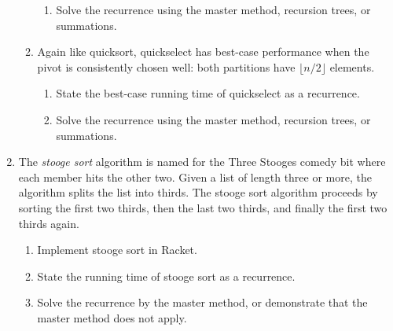 \documentclass{article}
\begin{document}
\begin{enumerate}
\begin{enumerate}
\begin{enumerate}
    \item Solve the recurrence using the master method, recursion trees, or
      summations.
    \end{enumerate}
  \item
    Again like quicksort, quickselect has best-case performance when the pivot
    is consistently chosen well: both partitions have \(\lfloor{n/2}\rfloor\)
    elements.
    \begin{enumerate}
    \item State the best-case running time of quickselect as a recurrence.
    \item Solve the recurrence using the master method, recursion trees, or
      summations.
    \end{enumerate}
  \end{enumerate}

  \pagebreak[1]
\item
  The \emph{stooge sort} algorithm is named for the Three Stooges comedy bit
  where each member hits the other two.  Given a list of length three or more,
  the algorithm splits the list into thirds.  The stooge sort algorithm proceeds
  by sorting the first two thirds, then the last two thirds, and finally the
  first two thirds again.
  \begin{enumerate}
  \item Implement stooge sort in Racket.
  \item State the running time of stooge sort as a recurrence.
  \item Solve the recurrence by the master method, or demonstrate that the
    master method does not apply.
  \end{enumerate}

\end{enumerate}
\end{document}
